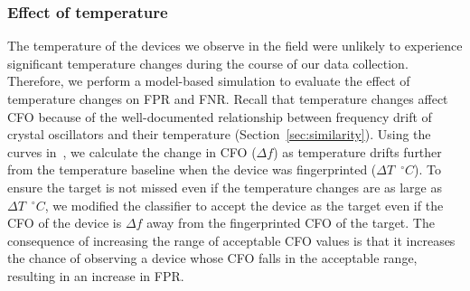 



\subsubsection{Effect of temperature} %
\label{sec:temp}




The temperature of the devices we observe in the field were unlikely to
experience significant temperature changes during the course of our data
collection. Therefore, we perform a model-based simulation to evaluate the
effect of temperature changes on FPR and FNR.  Recall that temperature changes
affect CFO because of the well-documented relationship between frequency drift
of crystal oscillators and their temperature (Section~\ref{sec:similarity}).
Using the curves in~\cite{temp_cfo1}, we calculate the change in CFO ($\Delta
f$) as temperature drifts further from the temperature baseline when the device
was fingerprinted ($\Delta T$~$^\circ C$). To ensure the target is not missed
even if the temperature changes are as large as $\Delta T$~$^\circ C$, we modified the
classifier to accept the device as the target even if the CFO of the device
is $\Delta f$ away from the fingerprinted CFO of the target. The consequence
of increasing the range of acceptable CFO values is that it increases the chance of
observing a device whose CFO falls in the acceptable range, resulting in an
increase in FPR.

